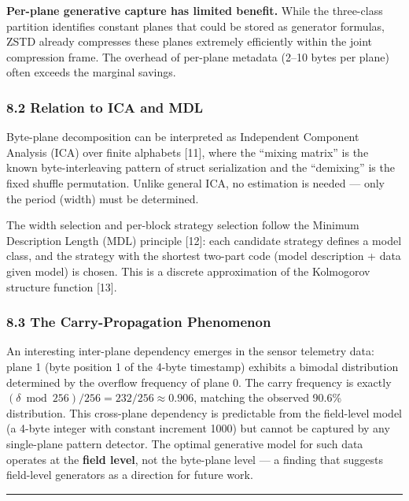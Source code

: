 \documentclass[
  11pt,
  letterpaper,
]{article}
\makeatletter
\renewcommand{\_}{\bpd@origunderscore\allowbreak}
\makeatother
\begin{document}
\textbf{Per-plane generative capture has limited benefit.} While the
three-class partition identifies constant planes that could be stored as
generator formulas, ZSTD already compresses these planes extremely
efficiently within the joint compression frame. The overhead of
per-plane metadata (2--10 bytes per plane) often exceeds the marginal
savings.

\hypertarget{relation-to-ica-and-mdl}{%
\subsubsection{8.2 Relation to ICA and
MDL}\label{relation-to-ica-and-mdl}}

Byte-plane decomposition can be interpreted as Independent Component
Analysis (ICA) over finite alphabets {[}11{]}, where the ``mixing
matrix'' is the known byte-interleaving pattern of struct serialization
and the ``demixing'' is the fixed shuffle permutation. Unlike general
ICA, no estimation is needed --- only the period (width) must be
determined.

The width selection and per-block strategy selection follow the Minimum
Description Length (MDL) principle {[}12{]}: each candidate strategy
defines a model class, and the strategy with the shortest two-part code
(model description + data given model) is chosen. This is a discrete
approximation of the Kolmogorov structure function {[}13{]}.

\hypertarget{the-carry-propagation-phenomenon}{%
\subsubsection{8.3 The Carry-Propagation
Phenomenon}\label{the-carry-propagation-phenomenon}}

An interesting inter-plane dependency emerges in the sensor telemetry
data: plane 1 (byte position 1 of the 4-byte timestamp) exhibits a
bimodal distribution determined by the overflow frequency of plane 0.
The carry frequency is exactly
\((\delta \bmod 256) / 256 = 232/256 \approx 0.906\), matching the
observed 90.6\% distribution. This cross-plane dependency is predictable
from the field-level model (a 4-byte integer with constant increment
1000) but cannot be captured by any single-plane pattern detector. The
optimal generative model for such data operates at the \textbf{field
level}, not the byte-plane level --- a finding that suggests field-level
generators as a direction for future work.

\begin{center}\rule{0.5\linewidth}{0.5pt}\end{center}
\end{document}
